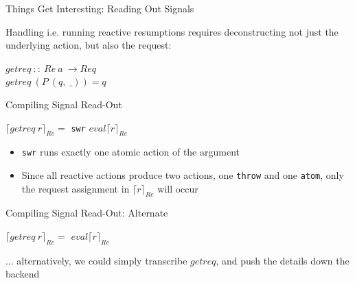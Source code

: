 \documentclass{beamer}
\begin{document}
\begin{frame}{Things Get Interesting: Reading Out Signals}

Handling i.e. running reactive resumptions requires deconstructing not just the underlying action, but also the request:

\begin{center}
\begin{onlinebox}{7cm}

$getreq\ ::\ Re\ a\ \rightarrow Req$\\
$getreq\ (P\ (q,\ \_)) = q$\\

\end{onlinebox}
\end{center}

\begin{structure}{Compiling Signal Read-Out}
\begin{onlinebox}{9cm}

$\lceil getreq\ r \rceil_{Re} =$ \texttt{swr} $eval \lceil r \rceil_{Re}$\\

\end{onlinebox}
\end{structure}

\begin{itemize}

\item{\texttt{swr} runs exactly one atomic action of the argument}

\item{Since all reactive actions produce two actions, one \texttt{throw} and one \texttt{atom}, only the request assignment in $\lceil r \rceil_{Re}$ will occur}

\end{itemize}

\pause

\begin{structure}{Compiling Signal Read-Out: Alternate}
\begin{onlinebox}{9cm}

$\lceil getreq\ r \rceil_{Re} =$ \texttt{\color{red}{getreq}} $eval \lceil r \rceil_{Re}$\\

\end{onlinebox}
\end{structure}

\smallskip

... alternatively, we could simply transcribe $getreq$, and push the details down the backend

\end{frame}
\end{document}
